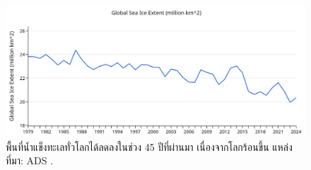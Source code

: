 \documentclass[10pt,twocolumn,letterpaper]{article}
\begin{document}
\begin{figure}[t]
\begin{center}
\includegraphics[width=1\textwidth]{ice.jpg}
\end{center}
   \caption{พื้นที่น้ำแข็งทะเลทั่วโลกได้ลดลงในช่วง 45 ปีที่ผ่านมา เนื่องจากโลกร้อนขึ้น แหล่งที่มา: ADS \cite{149}.}
\label{fig:24}
\end{figure}

\clearpage
\twocolumn

{\small
\renewcommand{\refname}{เอกสารอ้างอิง}


}
\end{document}
